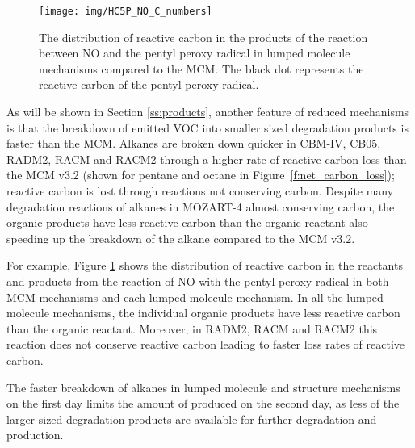%
\begin{figure}
    \centering
    \caption{The distribution of reactive carbon in the products of the reaction between NO and the pentyl peroxy radical in lumped molecule mechanisms compared to the MCM. The black dot represents the reactive carbon of the pentyl peroxy radical.}
    \texttt{[image: img/HC5P\_NO\_C\_numbers]}
    \label{f:HC5P_NO}
    \vspace{-2mm}
\end{figure}
%
As will be shown in Section \ref{ss:products}, another feature of reduced mechanisms is that the breakdown of emitted VOC into smaller sized degradation products is faster than the MCM.
Alkanes are broken down quicker in CBM-IV, CB05, RADM2, RACM and RACM2 through a higher rate of reactive carbon loss than the MCM v3.2 (shown for pentane and octane in \mbox{Figure \ref{f:net_carbon_loss}}); reactive carbon is lost through reactions not conserving carbon.
Despite many degradation reactions of alkanes in MOZART-4 almost conserving carbon, the organic products have less reactive carbon than the organic reactant also speeding up the breakdown of the alkane compared to the MCM v3.2.

For example, Figure \ref{f:HC5P_NO} shows the distribution of reactive carbon in the reactants and products from the reaction of NO with the pentyl peroxy radical in both MCM mechanisms and each lumped molecule mechanism.
In all the lumped molecule mechanisms, the individual organic products have less reactive carbon than the organic reactant. 
Moreover, in RADM2, RACM and RACM2 this reaction does not conserve reactive carbon leading to faster loss rates of reactive carbon. 

The faster breakdown of alkanes in lumped molecule and structure mechanisms on the first day limits the amount of  produced on the second day, as less of the larger sized degradation products are available for further degradation and  production.  
%

